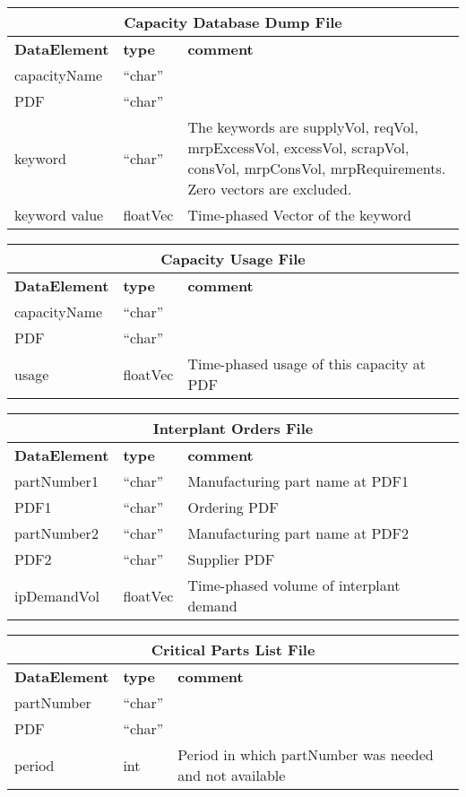 \begin{tabular}{llp{4in}}
\multicolumn{3}{c}{{\bf Capacity Database Dump File}}\\ \hline\hline
{\bf DataElement} &  {\bf type}  &   {\bf comment} \\ \hline
capacityName & ``char''  \\
PDF & ``char''  \\
keyword & ``char''  & The keywords are supplyVol, reqVol, mrpExcessVol, excessVol,
   scrapVol, consVol, mrpConsVol, mrpRequirements.
   Zero vectors are excluded.\\
keyword value  & floatVec &  Time-phased Vector of the keyword \\
\end{tabular}

\vspace{.5in}

\begin{tabular}{llp{4in}}
\multicolumn{3}{c}{{\bf Capacity Usage File}}\\ \hline\hline
{\bf DataElement} &  {\bf type}  &   {\bf comment} \\ \hline
capacityName &  ``char''     \\ 
PDF   & ``char''  \\
usage          & floatVec &  Time-phased usage of this capacity at PDF\\
\end{tabular}

\vspace{.5in}

\begin{tabular}{llp{4in}}
\multicolumn{3}{c}{{\bf Interplant Orders File}}\\ \hline\hline
{\bf DataElement} &  {\bf type}  &   {\bf comment} \\ \hline
partNumber1 &  ``char'' &  Manufacturing part name at PDF1  \\ 
PDF1   & ``char'' & Ordering PDF \\
partNumber2 &  ``char'' & Manufacturing part name at PDF2    \\ 
PDF2   & ``char'' & Supplier PDF \\
ipDemandVol & floatVec &  Time-phased volume of interplant demand \\
\end{tabular}

\vspace{.5in}

\begin{tabular}{llp{4in}}
\multicolumn{3}{c}{{\bf Critical Parts List File}}\\ \hline\hline
{\bf DataElement} &  {\bf type}  &   {\bf comment} \\ \hline
partNumber &  ``char''     \\ 
PDF   & ``char''  \\
period & int & Period in which partNumber was needed and not available
\end{tabular}

